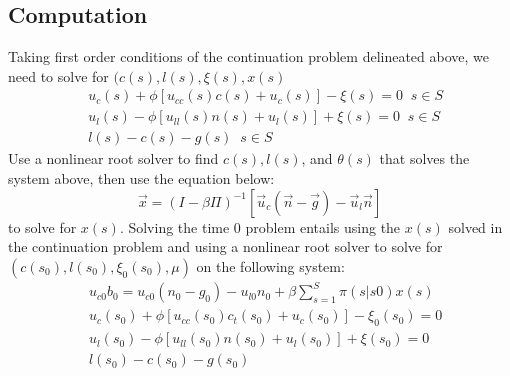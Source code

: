\documentclass{article} %
\begin{document}
\subsection{Computation}
Taking first order conditions of the continuation problem delineated above, we need to solve for $(c(s),l(s),\xi(s),x(s)$
\begin{align}
& u_c(s) + \phi[u_{cc}(s)c(s) + u_c(s)] - \xi(s) = 0 \;\; s\in S \\
& u_l(s) - \phi[u_{ll}(s)n(s) + u_l(s)] + \xi(s) = 0 \;\; s\in S \\ 
& l(s) - c(s) - g(s) \;\; s\in S
\end{align}
Use a nonlinear root solver to find $c(s),l(s)$, and $\theta(s)$ that solves the system above, then use the equation below:
$$\vec{x} = (I - \beta \Pi)^{-1}[\vec{u}_c(\vec{n} - \vec{g}) - \vec{u}_l \vec{n}]$$
to solve for $x(s)$. Solving the time 0 problem entails using the $x(s)$ solved in the continuation problem and using a nonlinear root solver to solve for $(c(s_0),l(s_0),\xi_0(s_0),\mu)$ on the following system:
\begin{align}
&u_{c0}b_0 = u_{c0}(n_0 - g_0) - u_{l0} n_0 + \beta \sum_{s=1}^S\pi(s|s0)x(s) \\
& u_{c}(s_0) + \phi[u_{cc}(s_0)c_t(s_0) + u_c(s_0)] - \xi_0(s_0) = 0  \\
& u_l(s_0) - \phi[u_{ll}(s_0)n(s_0) + u_l(s_0)] + \xi(s_0) = 0 \\ 
& l(s_0) - c(s_0) - g(s_0)
\end{align}
\end{document}
